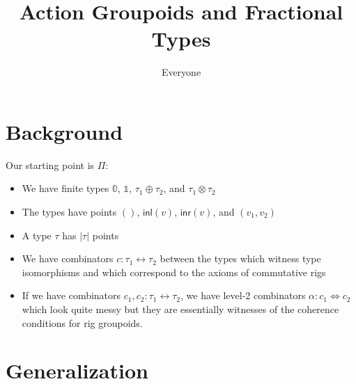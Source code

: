 \documentclass{article}
\title{Action Groupoids and Fractional Types}
\author{Everyone}
\newcommand{\inl}[1]{\textsf{inl}(#1)}
\newcommand{\inr}[1]{\textsf{inr}(#1)}
\newcommand{\zt}{\mathbb{0}}
\newcommand{\ot}{\mathbb{1}}
\begin{document}
\maketitle 

\section{Background}
 
Our starting point is $\Pi$:
\begin{itemize}
\item We have finite types $\zt$, $\ot$, $\tau_1\oplus\tau_2$, and $\tau_1\otimes\tau_2$
\item The types have points $()$, $\inl{v}$, $\inr{v}$, and $(v_1,v_2)$
\item A type $\tau$ has $|\tau|$ points
\item We have combinators $c : \tau_1\leftrightarrow\tau_2$ between the types which witness type isomorphisms and which correspond to the axioms of commutative rigs
\item If we have combinators $c_1, c_2 : \tau_1\leftrightarrow\tau_2$, we have level-2 combinators
$\alpha : c_1 \Leftrightarrow c_2$ which look quite messy but they are essentially witnesses of
the coherence conditions for rig groupoids.
\end{itemize}

\section{Generalization}
 
\end{document}
